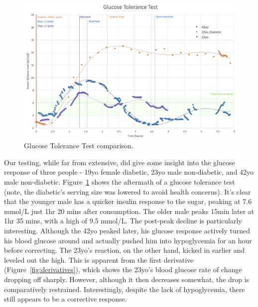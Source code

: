 \begin{figure}[!htb]
\centering\includegraphics[width=1.0\linewidth]{images/tolerancetest.png}
\caption{Glucose Tolerance Test comparison.}
\label{fig:tolerancetest}
\end{figure}

Our testing, while far from extensive, did give some insight into the glucose response of three people - 19yo female diabetic, 23yo male non-diabetic, and 42yo male non-diabetic. Figure~\ref{fig:tolerancetest} shows the aftermath of a glucose tolerance test (note, the diabetic’s serving size was lowered to avoid health concerns). It’s clear that the younger male has a quicker insulin response to the sugar, peaking at 7.6 mmol/L just 1hr 20 mins after consumption. The older male peaks 15min later at 1hr 35 mins, with a high of 9.5 mmol/L. The post-peak decline is particularly interesting. Although the 42yo peaked later, his glucose response actively turned his blood glucose around and actually pushed him into hypoglycemia for an hour before correcting. The 23yo’s reaction, on the other hand, kicked in earlier and leveled out the high. This is apparent from the first derivative (Figure~\ref{fig:derivatives}), which shows the 23yo’s blood glucose rate of change dropping off sharply. However, although it then decreases somewhat, the drop is comparatively restrained. Interestingly, despite the lack of hypoglycemia, there still appears to be a corrective response. 


